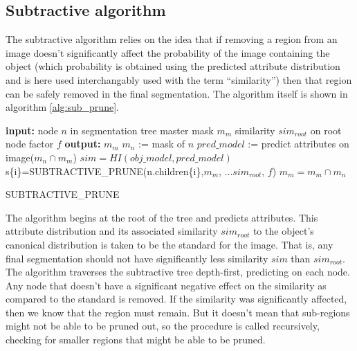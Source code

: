 \documentclass[10pt,twocolumn,letterpaper]{article}
\begin{document}
\subsection{Subtractive algorithm}

The subtractive algorithm relies on the idea that if removing a region from
an image doesn't significantly affect the probability of the image containing
the object (which probability is obtained using the predicted attribute
distribution and is here used interchangably used with the term ``similarity'')
then that region can be safely removed in the final segmentation.
The algorithm itself is shown in algorithm \ref{alg:sub_prune}.

\begin{algorithm}
\begin{algorithmic}
  \STATE \textbf{input:}
  \STATE \hspace{3 mm} node $n$ in segmentation tree
  \STATE \hspace{3 mm} master mask $m_m$
  \STATE \hspace{3 mm} similarity $sim_{root}$ on root node
  \STATE \hspace{3 mm} factor $f$
  \STATE \textbf{output:}
  \STATE \hspace{3 mm} $m_m$
  \STATE
  \STATE $m_n$ := mask of $n$
  \STATE $pred\_model$ := predict attributes on image($m_n \cap m_m$)
  \STATE $sim=HI(obj\_model,pred\_model)$
      \STATE s\{i\}=SUBTRACTIVE\_PRUNE(n.children\{i\},$m_m$,
      \STATE ...$sim_{root}$, $f$)
    \ENDFOR
  \ELSE
    \STATE $m_m = m_m \cap m_n$
  \ENDIF
\end{algorithmic}
\caption{SUBTRACTIVE\_PRUNE}
\label{alg:sub_prune}
\end{algorithm}

The algorithm begins at the root of the tree and predicts attributes.
This attribute distribution and its associated similarity $sim_{root}$
to the object's canonical distribution is taken to be
the standard for the image.  That is, any final segmentation should not have
significantly less similarity $sim$ than $sim_{root}$.  The algorithm traverses
the subtractive tree depth-first, predicting on each node.
Any node that doesn't have a significant negative effect on the similarity as
compared to the standard is removed.  If the
similarity was significantly affected, then we know that the region
must remain.  But it doesn't mean that sub-regions might not be able to be pruned
out, so the procedure is called recursively, checking for smaller regions
that might be able to be pruned.
\end{document}
